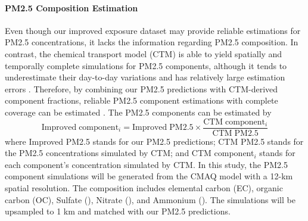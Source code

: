 \documentclass[11pt]{article}
\begin{document}
\paragraph{PM2.5 Composition Estimation}
Even though our improved exposure dataset may provide reliable estimations for PM2.5 concentrations, it lacks the information regarding PM2.5 composition. In contrast, the chemical transport model (CTM) is able to yield spatially and temporally complete simulations for PM2.5 components, although it tends to underestimate their day-to-day variations and has relatively large estimation errors \citep{Philip2014}. Therefore, by combining our PM2.5 predictions with CTM-derived component fractions, reliable PM2.5 component estimations with complete coverage can be estimated \citep{Si2017}. The PM2.5 components can be estimated by 
\begin{equation}
\mathrm{
Improved\;component_\mathit{i}=Improved\;PM2.5\times\frac{CTM\;component_\mathit{i}}{CTM\;PM2.5}
}
\end{equation}
where Improved PM2.5 stands for our PM2.5 predictions; CTM PM2.5 stands for the PM2.5 concentrations simulated by CTM; and CTM component$_i$ stands for each component's concentration simulated by CTM. In this study, the PM2.5 component simulations will be generated from the CMAQ model with a 12-km spatial resolution. The composition includes elemental carbon (EC), organic carbon (OC), Sulfate (), Nitrate (), and Ammonium (). The simulations will be upsampled to 1 km and matched with our PM2.5 predictions. 
\end{document}
